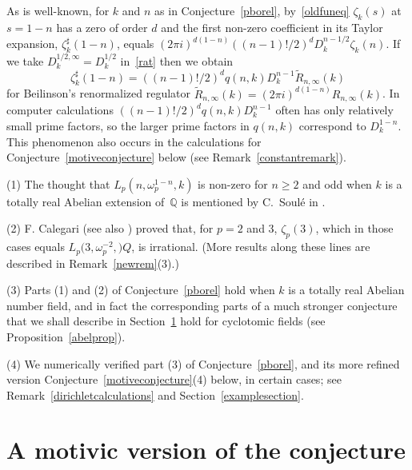 \documentclass{amsart}
\begin{document}
\begin{remark}\label{BBeq}
As is well-known, for $ k $ and $ n $ as in Conjecture~\ref{pborel},
by~\eqref{oldfuneq} $ {\zeta}_k(s) $ at $ s=1-n $ has a zero of order $ d $ and
the first non-zero coefficient in its Taylor expansion, $ {\zeta}_k^\sharp(1-n) $, equals
$ (2 \pi i )^{d(1-n)} ((n-1)!/2)^d  D_k^{n-1/2} {\zeta}_k(n) $.
If we take $ {D_k^{1/2,\infty}} = D_k^{1/2} $ in~\eqref{rat} then we obtain
\begin{equation*}
{\zeta}_k^\sharp(1-n) =  ((n-1)!/2)^d q(n,k) D_k^{n-1} \widetilde R_{n,\infty}(k)
\end{equation*}
for Beilinson's renormalized regulator $ \widetilde R_{n,\infty}(k) = (2\pi i)^{d(1-n)} R_{n,\infty}(k) $.
In computer calculations $ ((n-1)!/2)^d q(n,k) D_k^{n-1} $ often has only 
relatively small prime factors, so the larger prime factors in $ q(n,k) $ correspond to $ D_k^{1-n} $.
This phenomenon also occurs in the calculations for Conjecture~\ref{motiveconjecture} below
(see Remark~\ref{constantremark}).
\end{remark}

\begin{remark}
(1)
The thought that $ {L_{p}(n,\omega_p^{1-n},k)}$ is non-zero for $ n \ge 2 $ and
odd when $ k $ is a totally real Abelian extension of~$ {\mathbb Q} $
is mentioned by C.~Soul\'e in \cite[3.4]{sou81}.

(2)
F. Calegari \cite{Cal05} (see also \cite{Beu06}) proved that,
for $ p=2 $ and 3, $ {\zeta}_p(3) $, which in those cases equals  $ {L_{p}(3,\omega_p^{-2},{\mathbb)}Q} $, is irrational. 
(More results along these lines are described in Remark~\ref{newrem}(3).)

(3)
Parts (1) and (2) of Conjecture~\ref{pborel} hold when $ k $ is a totally real Abelian number field,
and in fact the corresponding parts of a much stronger conjecture that we shall describe in Section~\ref{motivicsection}
hold for cyclotomic fields (see Proposition~\ref{abelprop}).

(4)
We numerically verified part (3) of Conjecture~\ref{pborel}, and its
more refined version Conjecture~\ref{motiveconjecture}(4) below, in
certain cases; see Remark~\ref{dirichletcalculations} and
Section~\ref{examplesection}.
\end{remark}

\section{A motivic version of the conjecture}
\label{motivicsection}
\end{document}
